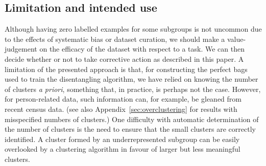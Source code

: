 \subsection{Limitation and intended use}
\label{sec:limitations}
%
Although having zero labelled examples for some subgroups is not uncommon due to the effects of
systematic bias or dataset curation, we should make a value-judgement on the efficacy of the dataset
with respect to a task.
%
We can then decide whether or not to take corrective action as described in this paper.
%
A limitation of the presented approach is that, for constructing the perfect bags used to train the
disentangling algorithm, we have relied on knowing the number of clusters \emph{a priori},
something that, in practice, is perhaps not the case. However, for person-related data, such
information can, for example, be gleaned from recent census data. (see also
Appendix~\ref{sec:overclustering} for results with misspecified numbers of clusters.)
%
%
One difficulty with automatic determination of the number of clusters is the need to ensure that
the small
clusters are correctly identified. 
%
A cluster formed by an underrepresented subgroup can be easily overlooked by a clustering algorithm
in favour of larger but less meaningful clusters.
